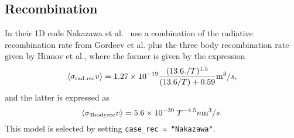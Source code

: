 \documentclass[amsmath,amssymb,a4]{revtex4-2}
\begin{document}
\subsection{Recombination}

In their 1D code Nakazawa et al.~\cite{nakazawa2000} use a combination of the radiative recombination rate from Gordeev et al. plus the three body recombination rate given by Hinnov et al., where the former is given by the expression~\cite{gordeev1977}
\begin{equation}\label{radiative_recombination}
    \langle\sigma_{\rm rad.rec} v\rangle = 1.27 \times 10^{-19} {(13.6./T)^{1.5} \over (13.6/T) + 0.59} {\rm m}^3 / s,
\end{equation}
and the latter is expressed as~\cite{hinnov1962}
\begin{equation}\label{three_body_recombination}
    \langle\sigma_{\rm 3bodyrec} v\rangle = 5.6 \times 10^{-39} \; T^{-4.5} n {\rm m}^3 / s.
\end{equation}
This model is selected by setting {\tt case\_rec = "Nakazawa"}.
\end{document}
